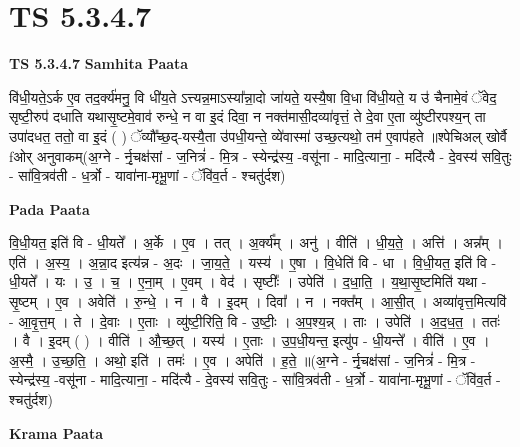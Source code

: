 \documentclass[17pt]{extarticle}
\begin{document}
\section{ TS 5.3.4.7 }

\textbf{TS 5.3.4.7 } \newline
\textbf{Samhita Paata} \newline

वि॑धी॒यते॒ऽर्क ए॒व तद॒र्क्य॑मनु॒ वि धी॑य॒ते ऽत्त्यन्न॒माऽस्या᳚न्ना॒दो जा॑यते॒ यस्यै॒षा वि॒धा वि॑धी॒यते॒ य उ॑ चैनामे॒वं ॅवेद॒ सृष्टी॒रुप॑ दधाति यथासृ॒ष्टमे॒वाव॑ रुन्धे॒ न वा इ॒दं दिवा॒ न नक्त॑मासी॒दव्या॑वृत्तं॒ ते दे॒वा ए॒ता व्यु॑ष्टीरपश्य॒न् ता उपा॑दधत॒ ततो॒ वा इ॒दं ( ) ॅव्यौ᳚च्छ॒द्-यस्यै॒ता उ॑पधी॒यन्ते॒ व्ये॑वास्मा॑ उच्छ॒त्यथो॒ तम॑ ए॒वाप॑हते ॥श्पेचिअल् खोर्वै fओर् अनुवाकम्(अ॒ग्ने - र्नृ॒चक्ष॑सां - ज॒नित्रं॑ - मि॒त्र - स्येन्द्र॑स्य॒ -वसू॑ना - मादि॒त्याना॒ - मदि॑त्यै - दे॒वस्य॑ सवि॒तुः - सा॑वि॒त्रव॑ती - ध॒र्त्रो - यावा॑ना-मृभू॒णां - ॅवि॑व॒र्त - श्चतु॑र्दश) \newline

\textbf{Pada Paata} \newline

वि॒धी॒यत॒ इति॑ वि - धी॒यते᳚ । अ॒र्के । ए॒व । तत् । अ॒र्क्य᳚म् । अनु॑ । वीति॑ । धी॒य॒ते॒ । अत्ति॑ । अन्न᳚म् । एति॑ । अ॒स्य॒ । अ॒न्ना॒द इत्य॑न्न - अ॒दः । जा॒य॒ते॒ । यस्य॑ । ए॒षा । वि॒धेति॑ वि - धा । वि॒धी॒यत॒ इति॑ वि - धी॒यते᳚ । यः । उ॒ । च॒ । ए॒ना॒म् । ए॒वम् । वेद॑ । सृष्टीः᳚ । उपेति॑ । द॒धा॒ति॒ । य॒था॒सृ॒ष्टमिति॑ यथा - सृ॒ष्टम् । ए॒व । अवेति॑ । रु॒न्धे॒ । न । वै । इ॒दम् । दिवा᳚ । न । नक्त᳚म् । आ॒सी॒त् । अव्या॑वृत्त॒मित्यवि॑ - आ॒वृ॒त्त॒म् । ते । दे॒वाः । ए॒ताः । व्यु॑ष्टी॒रिति॒ वि - उ॒ष्टीः॒ । अ॒प॒श्य॒न्न् । ताः । उपेति॑ । अ॒द॒ध॒त॒ । ततः॑ । वै । इ॒दम् ( ) । वीति॑ । औ॒च्छ॒त् । यस्य॑ । ए॒ताः । उ॒प॒धी॒यन्त॒ इत्यु॑प - धी॒यन्ते᳚ । वीति॑ । ए॒व । अ॒स्मै॒ । उ॒च्छ॒ति॒ । अथो॒ इति॑ । तमः॑ । ए॒व । अपेति॑ । ह॒ते॒ ॥(अ॒ग्ने - र्नृ॒चक्ष॑सां - ज॒नित्रं॑ - मि॒त्र - स्येन्द्र॑स्य॒ -वसू॑ना - मादि॒त्याना॒ - मदि॑त्यै - दे॒वस्य॑ सवि॒तुः - सा॑वि॒त्रव॑ती - ध॒र्त्रो - यावा॑ना-मृभू॒णां - ॅवि॑व॒र्त - श्चतु॑र्दश)  \newline


\textbf{Krama Paata} \newline
\end{document}
